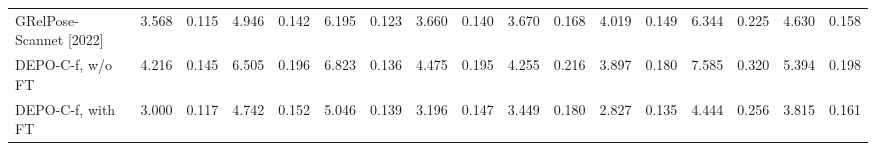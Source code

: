 \begin{table}[h!]
\begin{tabular}{lrrrrrrrrrrrrrrrr}
GRelPose-Scannet [2022]\cite{khatib2022grelpose} & {\cellcolor[HTML]{219C52}} \color[HTML]{F1F1F1} 3.568 & {\cellcolor[HTML]{006837}} \color[HTML]{F1F1F1} {\cellcolor{blue}} 0.115 & {\cellcolor[HTML]{06733D}} \color[HTML]{F1F1F1} 4.946 & {\cellcolor[HTML]{006837}} \color[HTML]{F1F1F1} {\cellcolor{blue}} 0.142 & {\cellcolor[HTML]{A9DA6C}} \color[HTML]{000000} 6.195 & {\cellcolor[HTML]{17934E}} \color[HTML]{F1F1F1} 0.123 & {\cellcolor[HTML]{148E4B}} \color[HTML]{F1F1F1} 3.660 & {\cellcolor[HTML]{0E8245}} \color[HTML]{F1F1F1} 0.140 & {\cellcolor[HTML]{097940}} \color[HTML]{F1F1F1} 3.670 & {\cellcolor[HTML]{006837}} \color[HTML]{F1F1F1} {\cellcolor{blue}} 0.168 & {\cellcolor[HTML]{51B35E}} \color[HTML]{F1F1F1} 4.019 & {\cellcolor[HTML]{0C7F43}} \color[HTML]{F1F1F1} 0.149 & {\cellcolor[HTML]{A5D86A}} \color[HTML]{000000} 6.344 & {\cellcolor[HTML]{B9E176}} \color[HTML]{000000} 0.225 & {\cellcolor[HTML]{2AA054}} \color[HTML]{F1F1F1} 4.630 & {\cellcolor[HTML]{006837}} \color[HTML]{F1F1F1} {\cellcolor{blue}} 0.158 \\
DEPO-C-f, w/o FT & {\cellcolor[HTML]{7DC765}} \color[HTML]{000000} 4.216 & {\cellcolor[HTML]{66BD63}} \color[HTML]{F1F1F1} 0.145 & {\cellcolor[HTML]{7AC665}} \color[HTML]{000000} 6.505 & {\cellcolor[HTML]{75C465}} \color[HTML]{000000} 0.196 & {\cellcolor[HTML]{CBE982}} \color[HTML]{000000} 6.823 & {\cellcolor[HTML]{60BA62}} \color[HTML]{F1F1F1} 0.136 & {\cellcolor[HTML]{70C164}} \color[HTML]{000000} 4.475 & {\cellcolor[HTML]{C9E881}} \color[HTML]{000000} 0.195 & {\cellcolor[HTML]{33A456}} \color[HTML]{F1F1F1} 4.255 & {\cellcolor[HTML]{8CCD67}} \color[HTML]{000000} 0.216 & {\cellcolor[HTML]{45AD5B}} \color[HTML]{F1F1F1} 3.897 & {\cellcolor[HTML]{4BB05C}} \color[HTML]{F1F1F1} 0.180 & {\cellcolor[HTML]{EBF7A3}} \color[HTML]{000000} 7.585 & {\cellcolor[HTML]{F57748}} \color[HTML]{F1F1F1} 0.320 & {\cellcolor[HTML]{7DC765}} \color[HTML]{000000} 5.394 & {\cellcolor[HTML]{70C164}} \color[HTML]{000000} 0.198 \\
DEPO-C-f, with FT & {\cellcolor[HTML]{006837}} \color[HTML]{F1F1F1} {\cellcolor{blue}} 3.000 & {\cellcolor[HTML]{036E3A}} \color[HTML]{F1F1F1} 0.117 & {\cellcolor[HTML]{006837}} \color[HTML]{F1F1F1} {\cellcolor{blue}} 4.742 & {\cellcolor[HTML]{0A7B41}} \color[HTML]{F1F1F1} 0.152 & {\cellcolor[HTML]{54B45F}} \color[HTML]{F1F1F1} 5.046 & {\cellcolor[HTML]{73C264}} \color[HTML]{000000} 0.139 & {\cellcolor[HTML]{006837}} \color[HTML]{F1F1F1} {\cellcolor{blue}} 3.196 & {\cellcolor[HTML]{199750}} \color[HTML]{F1F1F1} 0.147 & {\cellcolor[HTML]{006837}} \color[HTML]{F1F1F1} {\cellcolor{blue}} 3.449 & {\cellcolor[HTML]{108647}} \color[HTML]{F1F1F1} 0.180 & {\cellcolor[HTML]{006837}} \color[HTML]{F1F1F1} {\cellcolor{blue}} 2.827 & {\cellcolor[HTML]{006837}} \color[HTML]{F1F1F1} {\cellcolor{blue}} 0.135 & {\cellcolor[HTML]{138C4A}} \color[HTML]{F1F1F1} 4.444 & {\cellcolor[HTML]{FAFDB8}} \color[HTML]{000000} 0.256 & {\cellcolor[HTML]{006837}} \color[HTML]{F1F1F1} {\cellcolor{blue}} 3.815 & {\cellcolor[HTML]{04703B}} \color[HTML]{F1F1F1} 0.161 \\

\end{tabular}
\end{table}

